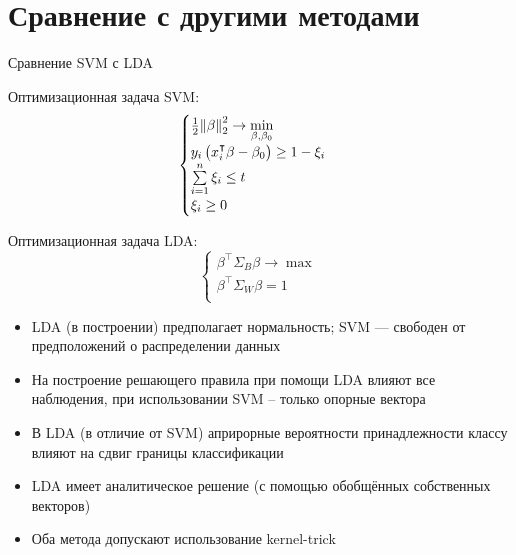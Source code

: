 \section{Сравнение с другими методами}
\begin{frame}{Сравнение SVM с LDA}
    \begin{minipage}{0.46\textwidth}
    Оптимизационная задача SVM:
    $$
	\begin{cases}
		\frac{1}{2}\norm{\beta}_2^2\rightarrow \min\limits_{\beta,\beta_0} \\
		y_i\left(x_i^\intercal \beta - \beta_0\right) \geq 1 - \xi_i \\
		\sum\limits_{i=1}^n\xi_i \leq t \\
		\xi_i\geq 0 \\
	\end{cases}
    $$
    \end{minipage}
    \begin{minipage}{0.46\textwidth}
    Оптимизационная задача LDA:
    $$
    \begin{cases}
    \beta^\intercal \Sigma_B \beta \rightarrow \max \\
    \beta^\intercal \Sigma_W \beta = 1\\
    \end{cases}
    $$
    \end{minipage}

    \begin{itemize}
        \item LDA (в построении) предполагает нормальность; SVM --- свободен от предположений
            о распределении данных
        \item На построение решающего правила при помощи LDA влияют все наблюдения,
            при использовании SVM -- только опорные вектора
        \item В LDA (в отличие от SVM) априрорные вероятности принадлежности классу влияют на сдвиг границы классификации
        \item LDA имеет аналитическое решение (с помощью обобщённых собственных векторов)
        \item Оба метода допускают использование kernel-trick
    \end{itemize}
\end{frame}






